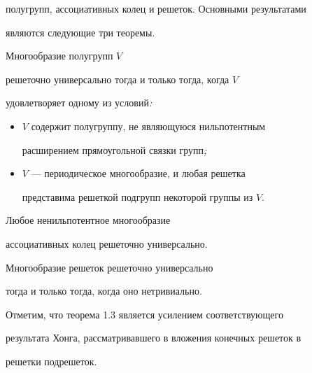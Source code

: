 полугрупп, ассоциативных колец и решеток. Основными результатами


являются следующие три теоремы.







\begin{thmm} Многообразие полугрупп $V$


решеточно универсально тогда и только тогда, когда $V$


удовлетворяет одному из условий{\em :}


\begin{itemize}


\item[(1)] $V$ содержит полугруппу, не являющуюся нильпотентным


расширением прямоугольной связки групп{\em ;}


\item[(2)] $V$ --- периодическое многообразие, и любая решетка


представима решеткой подгрупп некоторой группы из $V$.


\end{itemize}


\end{thmm}







\begin{thmm} Любое ненильпотентное многообразие


ассоциативных колец решеточно универсально.


\end{thmm}







\begin{thmm} Многообразие решеток решеточно универсально


тогда и только тогда, когда оно нетривиально.


\end{thmm}





Отметим, что теорема 1.3 является усилением соответствующего


результата Хонга, рассматривавшего в \cite{Hong} вложения конечных решеток в


решетки подрешеток.





